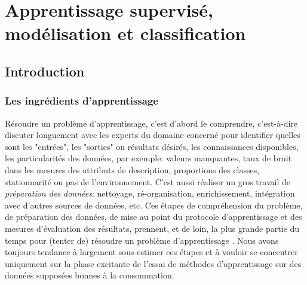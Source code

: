 	

		
%
%


\section{Apprentissage supervisé, modélisation et classification}
	\subsection{Introduction}
	\subsubsection{Les ingrédients d'apprentissage}
		Résoudre un problème d'apprentissage, c'est d'abord le comprendre, c'est-à-dire discuter longuement avec les experts du domaine concerné pour identifier quelles sont les "entrées", les  "sorties" ou résultats désirés, les connaissances disponibles, les particularités des données, par exemple: valeurs manquantes, taux de bruit dans les mesures des attributs de description, proportions des classes, stationnarité ou pas de l'environnement. 
		C'est aussi réaliser un gros travail de \textit{préparation des données}: nettoyage, ré-organisation, enrichissement, intégration avec d'autres sources de données, etc. Ces étapes de compréhension du problème, de préparation des données, de mise au point du protocole d'apprentissage et des mesures d'évaluation des résultats, prennent, et de loin, la plus grande partie du temps pour (tenter de) résoudre un problème d'apprentissage \cite{antoine2018apprentissage}. 
		Nous avons toujours tendance à largement sous-estimer ces étapes et à vouloir se concentrer uniquement sur la phase excitante de l'essai de méthodes d'apprentissage sur des données supposées bonnes à la consommation. 
	
